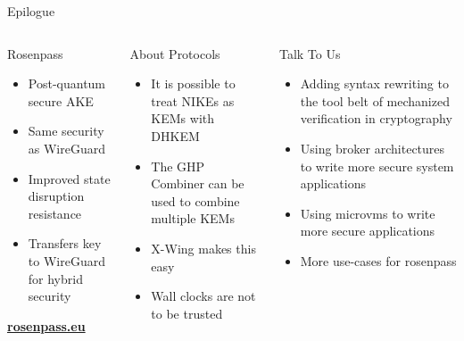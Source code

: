 
\begin{frame}[T]{Epilogue}
  \begin{columns}[t]
    \begin{column}{.30\linewidth}
      \begin{block}{Rosenpass\strut}
        \begin{itemize}
          \item Post-quantum secure AKE
          \item Same security as WireGuard
          \item Improved state disruption resistance
          \item Transfers key to WireGuard for hybrid security
        \end{itemize}
        \vspace{2em}
        \hfill\textbf{\url{rosenpass.eu}}
      \end{block}
    \end{column}

    \begin{column}{.33\linewidth}
      \begin{block}{About Protocols}
        \begin{itemize}
          \item It is possible to treat NIKEs as KEMs with DHKEM
          \item The GHP Combiner can be used to combine multiple KEMs
          \item X-Wing makes this easy
          \item Wall clocks are not to be trusted
        \end{itemize}
      \end{block}
    \end{column}

    \begin{column}{.36\linewidth}
      \begin{block}{Talk To Us\strut}
        \begin{itemize}
          \item Adding syntax rewriting to the tool belt of mechanized verification in cryptography
          \item Using broker architectures to write more secure system applications
          \item Using microvms to write more secure applications
          \item More use-cases for rosenpass
        \end{itemize}
      \end{block}
    \end{column}
  \end{columns}
\end{frame}
